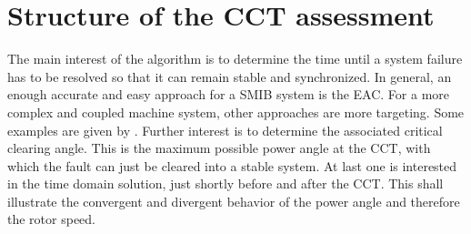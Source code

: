 \section{Structure of the \acs{CCT} assessment}

The main interest of the algorithm is to determine the time until a system failure has to be resolved so that it can remain stable and synchronized. In general, an enough accurate and easy approach for a \acs{SMIB} system is the \acs{EAC}. For a more complex and coupled machine system, other approaches are more targeting. Some examples are given by \textcite{batchuComparativeStudyEqual2022}. Further interest is to determine the associated critical clearing angle. This is the maximum possible power angle at the \acs{CCT}, with which the fault can just be cleared into a stable system. At last one is interested in the time domain solution, just shortly before and after the \acs{CCT}. This shall illustrate the convergent and divergent behavior of the power angle and therefore the rotor speed.

